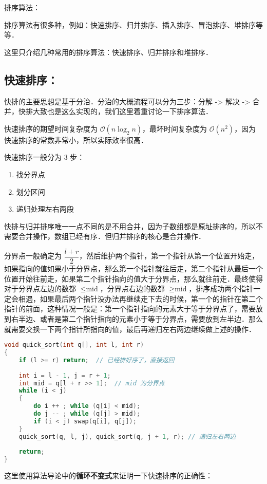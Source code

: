 
排序算法：

排序算法有很多种，例如：快速排序、归并排序、插入排序、冒泡排序、堆排序等等．

这里只介绍几种常用的排序算法：快速排序、归并排序和堆排序．

\subsection{快速排序：}

快排的主要思想是基于分治．分治的大概流程可以分为三步：分解 -> 解决 -> 合并，快排大致也是这么实现的，我们这里着重讨论一下排序算法．

快速排序的期望时间复杂度为 $\mathcal{O}(n \log_2 n)$，最坏时间复杂度为 $\mathcal{O}(n^2)$，因为快速排序的常数非常小，所以实际效率很高．

快速排序一般分为 $3$ 步：
\begin{enumerate}
\item 找分界点
\item 划分区间
\item 递归处理左右两段
\end{enumerate}

快排与归并排序唯一一点不同的是不用合并，因为子数组都是原址排序的，所以不需要合并操作，数组已经有序．但归并排序的核心是合并操作．

分界点一般确定为 $\dfrac{l+r}{2}$，然后维护两个指针，第一个指针从第一个位置开始走，如果指向的值如果小于分界点，那么第一个指针就往后走，第二个指针从最后一个位置开始往前走，如果第二个指针指向的值大于分界点，那么就往前走．最终使得对于分界点左边的数都 $\leq \text{mid}$，分界点右边的数都 $\geq \text{mid}$，排序成功两个指针一定会相遇，如果最后两个指针没办法再继续走下去的时候，第一个的指针在第二个指针的前面，这种情况一般是：第一个指针指向的元素大于等于分界点了，需要放到右半边、或者是第二个指针指向的元素小于等于分界点，需要放到左半边．那么就需要交换一下两个指针所指向的值，最后再递归左右两边继续做上述的操作．


\begin{lstlisting}[language=cpp]
void quick_sort(int q[], int l, int r)
{
    if (l >= r) return;  // 已经排好序了，直接返回
		
    int i = l - 1, j = r + 1;
    int mid = q[l + r >> 1];  // mid 为分界点
    while (i < j)
    {
        do i ++ ; while (q[i] < mid);
        do j -- ; while (q[j] > mid);
        if (i < j) swap(q[i], q[j]);
    }
    quick_sort(q, l, j), quick_sort(q, j + 1, r); // 递归左右两边
    
    return;
}

\end{lstlisting}


这里使用算法导论中的\textbf{循环不变式}来证明一下快速排序的正确性：
